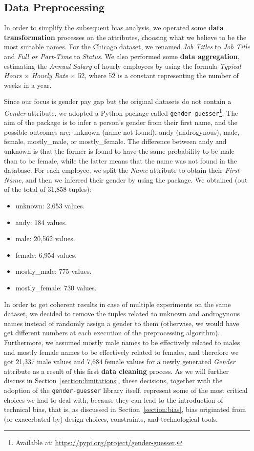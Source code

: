 \subsection{Data Preprocessing}
\label{section:chicago_data_preprocessing}
In order to simplify the subsequent bias analysis, we operated some \textbf{data transformation} processes on the attributes, choosing what we believe to be the most suitable names. For the Chicago dataset, we renamed \textit{Job Titles} to \textit{Job Title} and \textit{Full or Part-Time} to \textit{Status}. We also performed some \textbf{data aggregation}, estimating the \textit{Annual Salary} of hourly employees by using the formula \textit{Typical Hours} \(\times\) \textit{Hourly Rate} \(\times\) 52, where 52 is a constant representing the number of weeks in a year.

Since our focus is gender pay gap but the original datasets do not contain a \textit{Gender} attribute, we adopted a Python package called \texttt{gender-guesser}\footnote{Available at: \url{https://pypi.org/project/gender-guesser}.}. The aim of the package is to infer a person's gender from their first name, and the possible outcomes are: unknown (name not found), andy (androgynous), male, female, mostly\_male, or mostly\_female. The difference between andy and unknown is that the former is found to have the same probability to be male than to be female, while the latter means that the name was not found in the database. For each employee, we split the \textit{Name} attribute to obtain their \textit{First Name}, and then we inferred their gender by using the package. We obtained (out of the total of 31,858 tuples):
\begin{itemize}
\item unknown: 2,653 values.
\item andy: 184 values.
\item male: 20,562 values.
\item female: 6,954 values.
\item mostly\_male: 775 values.
\item mostly\_female: 730 values.
\end{itemize}
In order to get coherent results in case of multiple experiments on the same dataset, we decided to remove the tuples related to unknown and androgynous names instead of randomly assign a gender to them (otherwise, we would have get different numbers at each execution of the preprocessing algorithm). Furthermore, we assumed mostly male names to be effectively related to males and mostly female names to be effectively related to females, and therefore we got 21,337 male values and 7,684 female values for a newly generated \textit{Gender} attribute as a result of this first \textbf{data cleaning} process. As we will further discuss in Section~\ref{section:limitations}, these decisions, together with the adoption of the \texttt{gender-guesser} library itself, represent some of the most critical choices we had to deal with, because they can lead to the introduction of technical bias, that is, as discussed in Section~\ref{section:bias}, bias originated from (or exacerbated by) design choices, constraints, and technological tools.

